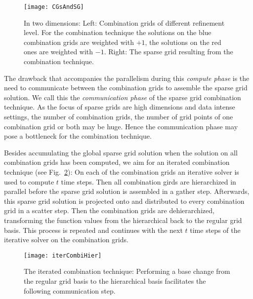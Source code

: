 \documentclass[letterpaper]{article}
\newcommand{\mypar}[1]{{\bf #1.}}
\begin{document}
			\begin{figure}[htbp]
				\texttt{[image: CGsAndSG]}
				\caption{In two dimensions: Left: Combination grids of different refinement level. For the combination technique the solutions on the blue combination grids are weighted with $+1$, the solutions on the red ones are weighted with $-1$. Right: The sparse grid resulting from the combination technique.}
				\label{fig:CGsAndSG}
			\end{figure}

			The drawback that accompanies the parallelism during this \emph{compute phase} is the need to communicate between the combination grids to assemble the sparse grid solution. We call this the \emph{communication phase} of the sparse grid combination technique. As the focus of sparse grids are high dimensions and data intense settings, the number of combination grids, the number of grid points of one combination grid or both may be huge. Hence the communication phase may pose a bottleneck for the combination technique.



		\noindent \mypar{The Iterated Combination Technique}
Besides accumulating the global sparse grid solution when the solution on all combination grids has been computed, we aim for an iterated combination technique \cite{griebel96numericalTurbulence} (see Fig.~\ref{fig:iterCombiHier}):
On each of the combination grids an iterative solver is used to compute $t$ time steps. Then all combination girds are hierarchized in parallel before the sparse grid solution is assembled in a gather step. Afterwards, this sparse grid solution is projected onto and distributed to every combination grid in a scatter step. Then the combination grids are dehierarchized, transforming the function values from the hierarchical back to the regular grid basis.  This process is repeated and continues with the next $t$ time steps of the iterative solver on the combination grids. 
\begin{figure}[htbp]\centering
				\texttt{[image: iterCombiHier]}
				\caption{The iterated combination technique: Performing a base change from the regular grid basis to the hierarchical basis facilitates the following communication step.}
				\label{fig:iterCombiHier}
			\end{figure}
\end{document}
